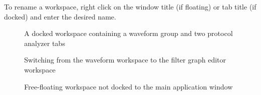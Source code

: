 To rename a workspace, right click on the window title (if floating) or tab title (if docked) and enter the desired
name.

\begin{figure}[h]
\centering
{}
\caption{A docked workspace containing a waveform group and two protocol analyzer tabs}
\label{w-workspace}
\end{figure}

\begin{figure}[h]
\centering
{}
\caption{Switching from the waveform workspace to the filter graph editor workspace}
\label{w-workspace2}
\end{figure}

\begin{figure}[h]
\centering
{}
\caption{Free-floating workspace not docked to the main application window}
\label{w-workspace3}
\end{figure}
